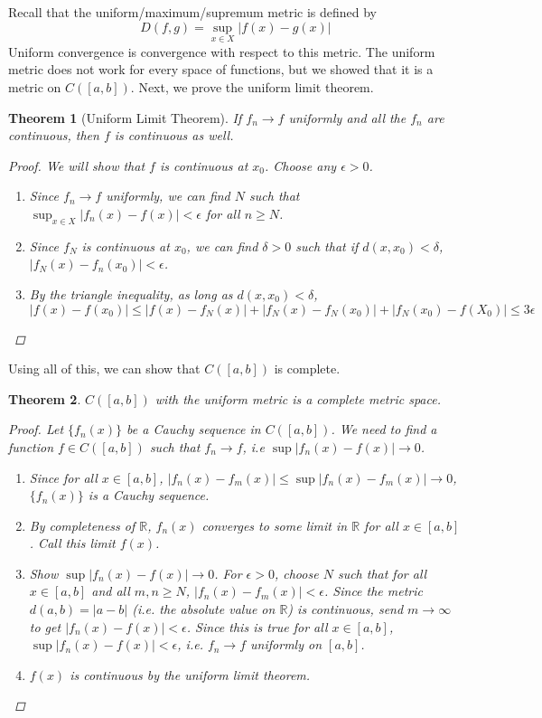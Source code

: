 \documentclass[10pt]{article}         %
\newtheorem{theorem}{Theorem}[section]
\theoremstyle{remark}
\newcommand{\R}{\mathbb{R}}
\begin{document}
Recall that the uniform/maximum/supremum metric is defined by
\[
D(f,g) = \sup_{x \in X}|f(x) - g(x)|
\]
Uniform convergence is convergence with respect to this metric. The uniform metric does not work for every space of functions, but we showed that it is a metric on $C([a,b])$. Next, we prove the uniform limit theorem.

\begin{theorem}[Uniform Limit Theorem]
If $f_n \rightarrow f$ uniformly and all the $f_n$ are continuous, then $f$ is continuous as well.
\begin{proof}
We will show that $f$ is continuous at $x_0$. Choose any $\epsilon > 0$.
\begin{enumerate}
\item Since $f_n \rightarrow f$ uniformly, we can find $N$ such that $\sup_{x \in X}|f_n(x) - f(x)| < \epsilon$ for all $n \geq N$.
\item Since $f_N$ is continuous at $x_0$, we can find $\delta > 0$ such that if $d(x, x_0) < \delta$, $|f_N(x) - f_n(x_0)| < \epsilon$. 
\item By the triangle inequality, as long as $d(x, x_0) < \delta$,
\[
|f(x) - f(x_0)| \leq |f(x) - f_N(x)| + |f_N(x) - f_N(x_0)| + |f_N(x_0) - f(X_0)| \leq 3 \epsilon
\]
\end{enumerate}
\end{proof}
\end{theorem}

Using all of this, we can show that $C([a,b])$ is complete.

\begin{theorem}
$C([a,b])$ with the uniform metric is a complete metric space.
\begin{proof}
Let $\{ f_n(x) \}$ be a Cauchy sequence in $C([a,b])$. We need to find a function $f \in C([a,b])$ such that $f_n \rightarrow f$, i.e $\sup|f_n(x) - f(x)| \rightarrow 0$.
\begin{enumerate}
    \item Since for all $x \in [a,b]$, $| f_n(x) - f_m(x)| \leq \sup| f_n(x) - f_m(x)| \rightarrow 0$, $\{ f_n(x) \}$ is a Cauchy sequence.
    \item By completeness of $\R$, $f_n(x)$ converges to some limit in $\R$ for all $x \in [a,b]$. Call this limit $f(x)$.
    \item Show $\sup| f_n(x) - f(x)| \rightarrow 0$. For $\epsilon > 0$, choose $N$ such that for all $x \in [a, b]$ and all $m, n \geq N$, $|f_n(x) - f_m(x)| < \epsilon$. Since the metric $d(a,b) = |a - b|$ (i.e. the absolute value on $\R$) is continuous, send $m \rightarrow \infty$ to get $|f_n(x) - f(x)| < \epsilon$. Since this is true for all $x \in [a,b]$, $\sup|f_n(x) - f(x)| < \epsilon$, i.e. $f_n \rightarrow f$ uniformly on $[a,b]$.
    \item $f(x)$ is continuous by the uniform limit theorem.
\end{enumerate}
\end{proof}
\end{theorem}
\end{document}
